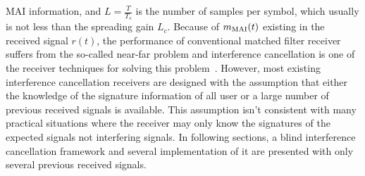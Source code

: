 \documentclass[conference]{IEEEtran}
\begin{document}
MAI information, and $L=\frac{T}{T_s}$ is the number of samples
per symbol, which usually is not less than the spreading gain
$L_c$. Because of $m_{\rm MAI}(t)$ existing in the received signal
$r(t)$, the performance of conventional matched filter receiver
suffers from the so-called near-far problem and interference
cancellation is one of the receiver techniques for solving this
problem~\cite{Verd98}. However, most existing interference
cancellation receivers are designed with the assumption that
either the knowledge of the signature information of all user or a
large number of previous received signals is available. This
assumption isn't consistent with many practical situations where
the receiver may only know the signatures of the expected signals
not interfering signals. In following sections, a blind
interference cancellation framework and several implementation of
it are presented with only several previous received signals.
\end{document}
